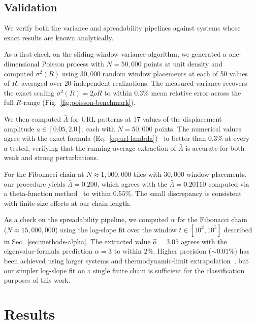 \documentclass[11pt]{article}
\begin{document}
\subsection{Validation}
\label{sec:methods-validation}

We verify both the variance and spreadability pipelines against systems whose exact results are known analytically.

As a first check on the sliding-window variance algorithm, we generated a one-dimensional Poisson process with $N = 50{,}000$ points at unit density and computed $\sigma^2(R)$ using $30{,}000$ random window placements at each of 50 values of $R$, averaged over 20 independent realizations. The measured variance recovers the exact scaling $\sigma^2(R) = 2\rho R$ to within $0.3\%$ mean relative error across the full $R$-range (Fig.~\ref{fig:poisson-benchmark}).

We then computed $\bar\Lambda$ for URL patterns at 17 values of the displacement amplitude $a \in [0.05, 2.0]$, each with $N = 50{,}000$ points. The numerical values agree with the exact formula (Eq.~\ref{eq:url-lambda})~\cite{klatt2020perturbed} to better than $0.3\%$ at every $a$ tested, verifying that the running-average extraction of $\bar\Lambda$ is accurate for both weak and strong perturbations.

For the Fibonacci chain at $N \approx 1{,}000{,}000$ tiles with $30{,}000$ window placements, our procedure yields $\bar\Lambda = 0.200$, which agrees with the $\bar\Lambda = 0.20110$ computed via a theta-function method~\cite{zachary2009hyperuniform} to within $0.55\%$. The small discrepancy is consistent with finite-size effects at our chain length.

As a check on the spreadability pipeline, we computed $\alpha$ for the Fibonacci chain ($N \approx 15{,}000{,}000$) using the log-slope fit over the window $t \in [10^2, 10^5]$ described in Sec.~\ref{sec:methods-alpha}. The extracted value $\hat\alpha = 3.05$ agrees with the eigenvalue-formula prediction $\alpha = 3$ to within $2\%$. Higher precision (${\sim}0.01\%$) has been achieved using larger systems and thermodynamic-limit extrapolation~\cite{hitinbialus2024}, but our simpler log-slope fit on a single finite chain is sufficient for the classification purposes of this work.

\section{Results}
\label{sec:results}
\end{document}

